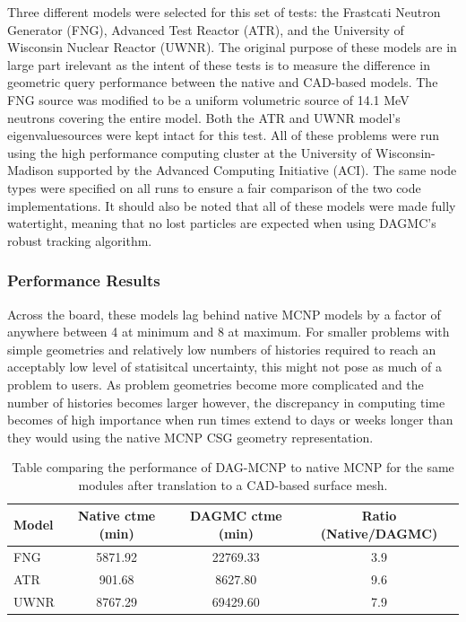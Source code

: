 \documentclass[12pt, a4paper]{article}
\begin{document}
Three different models were selected for this set of tests: the Frastcati Neutron Generator (FNG), Advanced Test Reactor (ATR), and the University of Wisconsin Nuclear Reactor (UWNR). The original purpose of these models are in large part irelevant as the intent of these tests is to measure the difference in geometric query performance between the native and CAD-based models. The FNG source was modified to be a uniform volumetric source of 14.1 MeV neutrons covering the entire model. Both the ATR and UWNR model's eigenvaluesources were kept intact for this test. All of these problems were run using the high performance computing cluster at the University of Wisconsin-Madison supported by the Advanced Computing Initiative (ACI). The same node types were specified on all runs to ensure a fair comparison of the two code implementations. It should also be noted that all of these models were made fully watertight, meaning that no lost particles are expected when using DAGMC's robust tracking algorithm.

\subsubsection{Performance Results}%

Across the board, these models lag behind native MCNP models by a factor of anywhere between 4 at minimum  and 8 at maximum. For smaller problems with simple geometries and relatively low numbers of histories required to reach an acceptably low level of statisitcal uncertainty, this might not pose as much of a problem to users. As problem geometries become more complicated and the number of histories becomes larger however, the discrepancy in computing time becomes of high importance when run times extend to days or weeks longer than they would using the native MCNP CSG geometry representation.

\begin{table}[H]
  \centering
  \begin{tabular}{l c c c}
    \toprule
    Model & Native ctme (min) & DAGMC ctme (min) & Ratio (Native/DAGMC) \\
    \hline
    FNG &  5871.92 & 22769.33 & 3.9\\
    ATR &  901.68 & 8627.80 & 9.6 \\
    UWNR &  8767.29 & 69429.60 & 7.9\\
    \hline
  \end{tabular}
  \caption{Table comparing the performance of DAG-MCNP to native MCNP for the same modules after translation to a CAD-based surface mesh.}
  \label{DAG-MCNP_performance}  
\end{table}
\end{document}
